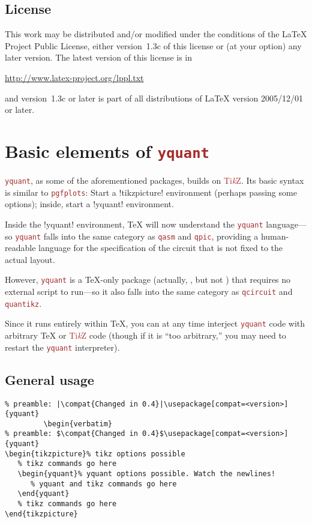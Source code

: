 \documentclass{scrartcl}
\makeatletter
\def\TikZ{\textcolor{brown}{Ti\textit kZ}}
\def\pkg#1{\textcolor{brown}{\texttt{#1}}}
\def\Yquant{\pkg{yquant}}
\newcommand*{\the@orig@section}{}
\let\the@orig@section=\section
\renewcommand*{\section}{%
   \clearpage%
   \the@orig@section%
}
\makeatother
\begin{document}
      \subsection{License}
          This work may be distributed and/or modified under the conditions of the \LaTeX{} Project Public License, either version~1.3c of this license or (at your option) any later version.
          The latest version of this license is in
          \begin{center}
             \url{http://www.latex-project.org/lppl.txt}
          \end{center}
          and version~1.3c or later is part of all distributions of LaTeX version 2005/12/01 or later.

   \section{Basic elements of \Yquant}\label{sec:grammar}
      \Yquant, as some of the aforementioned packages, builds on \TikZ.
      Its basic syntax is similar to \pkg{pgfplots}: Start a \tex!tikzpicture! environment (perhaps passing some options); inside, start a \tex!yquant! environment.

      Inside the \tex!yquant! environment, \TeX{} will now understand the \Yquant{} language---so \Yquant{} falls into the same category as \pkg{qasm} and \pkg{qpic}, providing a human\hyp readable language for the specification of the circuit that is not fixed to the actual layout.

      However, \Yquant{} is a \TeX\hyp only package (actually, , but not ) that requires no external script to run---so it also falls into the same category as \pkg{qcircuit} and \pkg{quantikz}.

      Since it runs entirely within \TeX, you can at any time interject \Yquant{} code with arbitrary \TeX{} or \TikZ{} code (though if it is ``too arbitrary,'' you may need to restart the \Yquant{} interpreter).

      \subsection{General usage}
         \begin{verbatim}
% preamble: |\compat{Changed in 0.4}|\usepackage[compat=<version>]{yquant}
         \begin{verbatim}
% preamble: $\compat{Changed in 0.4}$\usepackage[compat=<version>]{yquant}
\begin{tikzpicture}% tikz options possible
   % tikz commands go here
   \begin{yquant}% yquant options possible. Watch the newlines!
      % yquant and tikz commands go here
   \end{yquant}
   % tikz commands go here
\end{tikzpicture}
         \end{verbatim}
\end{document}
